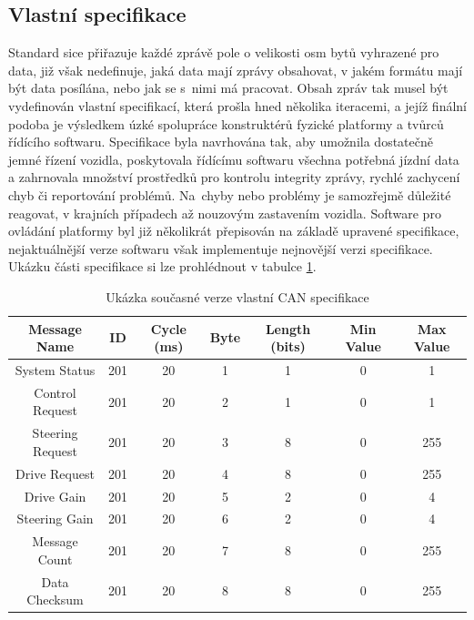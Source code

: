 \documentclass[czech, bachelor]{diploma}
\begin{document}
\subsection{Vlastní specifikace}
Standard sice přiřazuje každé zprávě pole o velikosti osm bytů vyhrazené pro data, již však nedefinuje, jaká data mají zprávy
obsahovat, v jakém formátu mají být data posílána, nebo jak se s~nimi má pracovat\cite{can-source}. Obsah zpráv tak musel být
vydefinován vlastní specifikací, která prošla hned několika iteracemi, a jejíž finální podoba je výsledkem úzké spolupráce
konstruktérů fyzické platformy a tvůrců řídícího softwaru. Specifikace byla navrhována tak, aby umožnila dostatečně jemné řízení
vozidla, poskytovala řídícímu softwaru všechna potřebná jízdní data a zahrnovala množství prostředků pro kontrolu integrity
zprávy, rychlé zachycení chyb či reportování problémů. Na~chyby nebo problémy je samozřejmě důležité reagovat, v krajních
případech až nouzovým zastavením vozidla. Software pro ovládání platformy byl již několikrát přepisován na základě upravené
specifikace, nejaktuálnější verze softwaru však implementuje nejnovější verzi specifikace. Ukázku části specifikace si lze
prohlédnout v tabulce \ref{tab:can-spec-table}.

\begin{table}
  \centering
  \caption{Ukázka současné verze vlastní CAN specifikace}
  \label{tab:can-spec-table}
  \begin{tabular}{ |c|c|c|c|c|c|c| }
    \hline
    Message Name     & ID  & Cycle (ms) & Byte & Length (bits) & Min Value & Max Value \\
    \hline
    System Status    & 201 & 20         & 1    & 1             & 0         & 1 \\
    \hline
    Control Request  & 201 & 20         & 2    & 1             & 0         & 1 \\
    \hline
    Steering Request & 201 & 20         & 3    & 8             & 0         & 255 \\
    \hline
    Drive Request    & 201 & 20         & 4    & 8             & 0         & 255 \\
    \hline
    Drive Gain       & 201 & 20         & 5    & 2             & 0         & 4 \\
    \hline
    Steering Gain    & 201 & 20         & 6    & 2             & 0         & 4 \\
    \hline
    Message Count    & 201 & 20         & 7    & 8             & 0         & 255 \\
    \hline
    Data Checksum    & 201 & 20         & 8    & 8             & 0         & 255 \\
    \hline
  \end{tabular}
\end{table}
\end{document}
